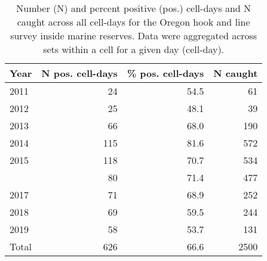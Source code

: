 
\begin{longtable}[t]{lrrr}
\caption{\label{tab:fi-index-ormarres-N}Number (N) and percent positive (pos.) cell-days and N caught across all cell-days for the Oregon hook and line survey inside marine reserves. Data were aggregated across sets within a cell for a given day (cell-day).}\\
\toprule
Year & N pos. cell-days & \% pos. cell-days & N caught\\
\midrule
\midrule
2011 & 24 & 54.5 & 61\\
2012 & 25 & 48.1 & 39\\
2013 & 66 & 68.0 & 190\\
2014 & 115 & 81.6 & 572\\
2015 & 118 & 70.7 & 534\\
\addlinespace
2016 & 80 & 71.4 & 477\\
2017 & 71 & 68.9 & 252\\
2018 & 69 & 59.5 & 244\\
2019 & 58 & 53.7 & 131\\
Total & 626 & 66.6 & 2500\\
\bottomrule
\end{longtable}
